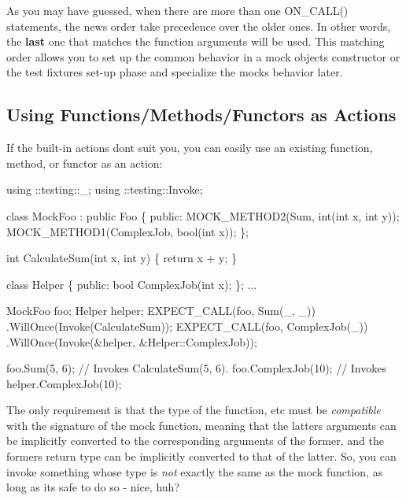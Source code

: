 As you may have guessed, when there are more than one {\ttfamily O\+N\+\_\+\+C\+A\+L\+L()} statements, the news order take precedence over the older ones. In other words, the {\bfseries last} one that matches the function arguments will be used. This matching order allows you to set up the common behavior in a mock object\textquotesingle{}s constructor or the test fixture\textquotesingle{}s set-\/up phase and specialize the mock\textquotesingle{}s behavior later.

\subsection*{Using Functions/\+Methods/\+Functors as Actions}

If the built-\/in actions don\textquotesingle{}t suit you, you can easily use an existing function, method, or functor as an action\+:


\begin{DoxyCode}
using ::testing::\_;
using ::testing::Invoke;

\textcolor{keyword}{class }MockFoo : \textcolor{keyword}{public} Foo \{
 \textcolor{keyword}{public}:
  MOCK\_METHOD2(Sum, \textcolor{keywordtype}{int}(\textcolor{keywordtype}{int} x, \textcolor{keywordtype}{int} y));
  MOCK\_METHOD1(ComplexJob, \textcolor{keywordtype}{bool}(\textcolor{keywordtype}{int} x));
\};

\textcolor{keywordtype}{int} CalculateSum(\textcolor{keywordtype}{int} x, \textcolor{keywordtype}{int} y) \{ \textcolor{keywordflow}{return} x + y; \}

\textcolor{keyword}{class }Helper \{
 \textcolor{keyword}{public}:
  \textcolor{keywordtype}{bool} ComplexJob(\textcolor{keywordtype}{int} x);
\};
...

  MockFoo foo;
  Helper helper;
  EXPECT\_CALL(foo, Sum(\_, \_))
      .WillOnce(Invoke(CalculateSum));
  EXPECT\_CALL(foo, ComplexJob(\_))
      .WillOnce(Invoke(&helper, &Helper::ComplexJob));

  foo.Sum(5, 6);       \textcolor{comment}{// Invokes CalculateSum(5, 6).}
  foo.ComplexJob(10);  \textcolor{comment}{// Invokes helper.ComplexJob(10);}
\end{DoxyCode}


The only requirement is that the type of the function, etc must be {\itshape compatible} with the signature of the mock function, meaning that the latter\textquotesingle{}s arguments can be implicitly converted to the corresponding arguments of the former, and the former\textquotesingle{}s return type can be implicitly converted to that of the latter. So, you can invoke something whose type is {\itshape not} exactly the same as the mock function, as long as it\textquotesingle{}s safe to do so -\/ nice, huh?

